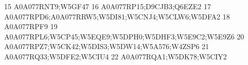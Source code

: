 \documentclass{beamer}
\begin{document}
\begin{frame}[fragile]
\begin{itemize}
\begin{Schunk}
\begin{Soutput}
15                                                                                                                                                                                                                                                                                                                                                              A0A077RNT9;W5GF47
16                                                                                                                                                                                                                                                                                                                                                       A0A077RP15;D9CJB3;Q6EZE2
17                                                                                                                                                                                                                                                                                                                              A0A077RPD6;A0A077RRW5;W5DI81;W5CNJ4;W5CLW6;W5DFA2
18                                                                                                                                                                                                                                                                                                                                                                     A0A077RPF9
19                                                                                                                                                                                                                                                                                                                           A0A077RPL6;W5CP45;W5EQE9;W5DPH0;W5DHF3;W5E9C2;W5E9Z6
20                                                                                                                                                                                                                                                                                                                                  A0A077RPZ7;W5CK42;W5DIS3;W5DW14;W5A576;W4ZSP6
21                                                                                                                                                                                                                                                                                                                                                       A0A077RQ33;W5DFE2;W5CIU4
22                                                                                                                                                                                                                                                                                                                                                       A0A077RQA1;W5DK78;W5CIY2

\end{Soutput}
\end{Schunk}
\end{itemize}
\end{frame}
\end{document}

